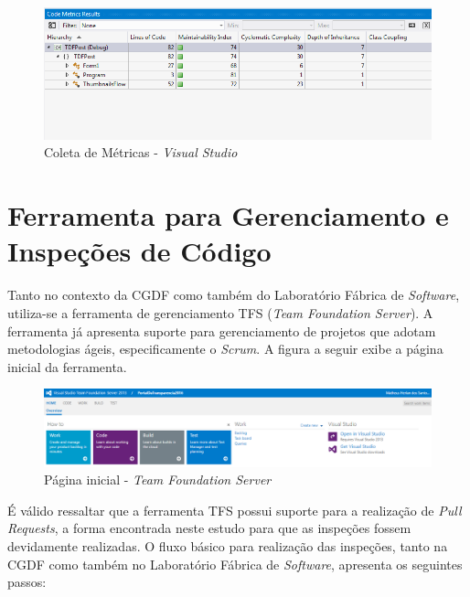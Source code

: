 \begin{figure}[!h]
\includegraphics[width=\textwidth]{figuras/metricsVS.png}
\caption{Coleta de Métricas - \textit{Visual Studio}}
\end{figure}

\section{Ferramenta para Gerenciamento e Inspeções de Código}

Tanto no contexto da CGDF como também do Laboratório Fábrica de \textit{Software}, utiliza-se a ferramenta de gerenciamento TFS (\textit{Team Foundation Server}). A ferramenta já apresenta suporte para gerenciamento de projetos que adotam metodologias ágeis, especificamente o \textit{Scrum}. A figura a seguir exibe a página inicial da ferramenta.

\begin{figure}[!h]
\includegraphics[width=\textwidth]{figuras/tfs.png}
\caption{Página inicial - \textit{Team Foundation Server}}
\end{figure}

É válido ressaltar que a ferramenta TFS possui suporte para a realização de \textit{Pull Requests}, a forma encontrada neste estudo para que as inspeções fossem devidamente realizadas. O fluxo básico para realização das inspeções, tanto na CGDF como também no Laboratório Fábrica de \textit{Software}, apresenta os seguintes passos:

